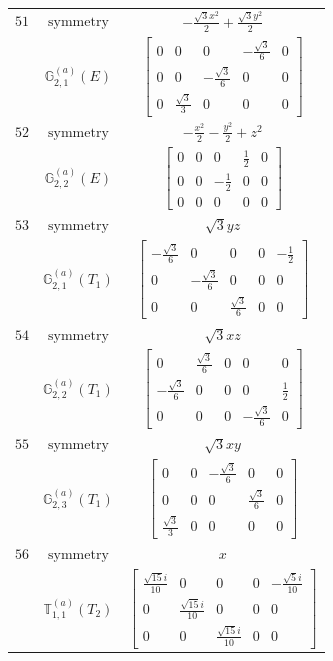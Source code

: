 \documentclass[fleqn,8pt,landscape]{jsarticle}
\begin{document}
\begin{longtable}{ccc}
$ 51 $ & $ \text{symmetry} $ & $ - \frac{\sqrt{3} x^{2}}{2} + \frac{\sqrt{3} y^{2}}{2} $ \\
$  $ & $ \mathbb{G}_{2,1}^{(a)}(E) $ & $ \begin{bmatrix} 0 & 0 & 0 & - \frac{\sqrt{3}}{6} & 0 \\ 0 & 0 & - \frac{\sqrt{3}}{6} & 0 & 0 \\ 0 & \frac{\sqrt{3}}{3} & 0 & 0 & 0 \end{bmatrix} $ \\ \hline
$ 52 $ & $ \text{symmetry} $ & $ - \frac{x^{2}}{2} - \frac{y^{2}}{2} + z^{2} $ \\
$  $ & $ \mathbb{G}_{2,2}^{(a)}(E) $ & $ \begin{bmatrix} 0 & 0 & 0 & \frac{1}{2} & 0 \\ 0 & 0 & - \frac{1}{2} & 0 & 0 \\ 0 & 0 & 0 & 0 & 0 \end{bmatrix} $ \\ \hline
$ 53 $ & $ \text{symmetry} $ & $ \sqrt{3} y z $ \\
$  $ & $ \mathbb{G}_{2,1}^{(a)}(T_{1}) $ & $ \begin{bmatrix} - \frac{\sqrt{3}}{6} & 0 & 0 & 0 & - \frac{1}{2} \\ 0 & - \frac{\sqrt{3}}{6} & 0 & 0 & 0 \\ 0 & 0 & \frac{\sqrt{3}}{6} & 0 & 0 \end{bmatrix} $ \\ \hline
$ 54 $ & $ \text{symmetry} $ & $ \sqrt{3} x z $ \\
$  $ & $ \mathbb{G}_{2,2}^{(a)}(T_{1}) $ & $ \begin{bmatrix} 0 & \frac{\sqrt{3}}{6} & 0 & 0 & 0 \\ - \frac{\sqrt{3}}{6} & 0 & 0 & 0 & \frac{1}{2} \\ 0 & 0 & 0 & - \frac{\sqrt{3}}{6} & 0 \end{bmatrix} $ \\ \hline
$ 55 $ & $ \text{symmetry} $ & $ \sqrt{3} x y $ \\
$  $ & $ \mathbb{G}_{2,3}^{(a)}(T_{1}) $ & $ \begin{bmatrix} 0 & 0 & - \frac{\sqrt{3}}{6} & 0 & 0 \\ 0 & 0 & 0 & \frac{\sqrt{3}}{6} & 0 \\ \frac{\sqrt{3}}{3} & 0 & 0 & 0 & 0 \end{bmatrix} $ \\ \hline
$ 56 $ & $ \text{symmetry} $ & $ x $ \\
$  $ & $ \mathbb{T}_{1,1}^{(a)}(T_{2}) $ & $ \begin{bmatrix} \frac{\sqrt{15} i}{10} & 0 & 0 & 0 & - \frac{\sqrt{5} i}{10} \\ 0 & \frac{\sqrt{15} i}{10} & 0 & 0 & 0 \\ 0 & 0 & \frac{\sqrt{15} i}{10} & 0 & 0 \end{bmatrix} $ \\ \hline

\end{longtable}
\end{document}
